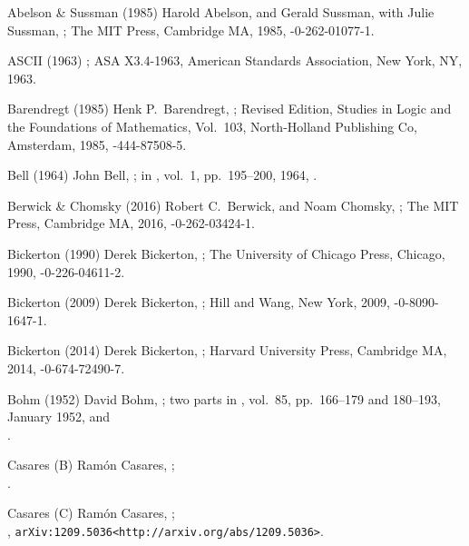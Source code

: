 

\biblabel Abelson \& Sussman (1985)
Harold Abelson, and Gerald Sussman, with Julie Sussman,
;
The MIT Press, Cambridge MA, 1985,
-0-262-01077-1.

\biblabel ASCII (1963)
;
ASA X3.4-1963,
American Standards Association, New York, NY, 1963.

\biblabel Barendregt (1985)
Henk P.\ Barendregt,
;
Revised Edition, Studies in Logic and the Foundations of Mathematics,
Vol.\ 103, North-Holland Publishing Co, Amsterdam, 1985,
-444-87508-5.

\biblabel Bell (1964)
John Bell,
;
in ,
vol.\ 1, pp.\ 195--200, 1964,
.

\biblabel Berwick \& Chomsky (2016)
Robert C.\ Berwick, and Noam Chomsky,
;
The MIT Press, Cambridge MA, 2016,
-0-262-03424-1.

\biblabel Bickerton (1990)
Derek Bickerton,
;
The University of Chicago Press, Chicago, 1990,
-0-226-04611-2.

\biblabel Bickerton (2009)
Derek Bickerton,
;
Hill and Wang, New York, 2009,
-0-8090-1647-1.

\biblabel Bickerton (2014)
Derek Bickerton,
;
Harvard University Press, Cambridge MA, 2014,
-0-674-72490-7.

\biblabel Bohm (1952)
David Bohm,
; two parts
in ,
vol.\ 85, pp.\ 166--179 and 180--193, January 1952,
 and\\
.

\biblabel Casares (B)
Ramón Casares,
;\\
.

\biblabel Casares (C)
Ramón Casares,
;\\
,
{\tt\URL arXiv:1209.5036<http://arxiv.org/abs/1209.5036>}.

